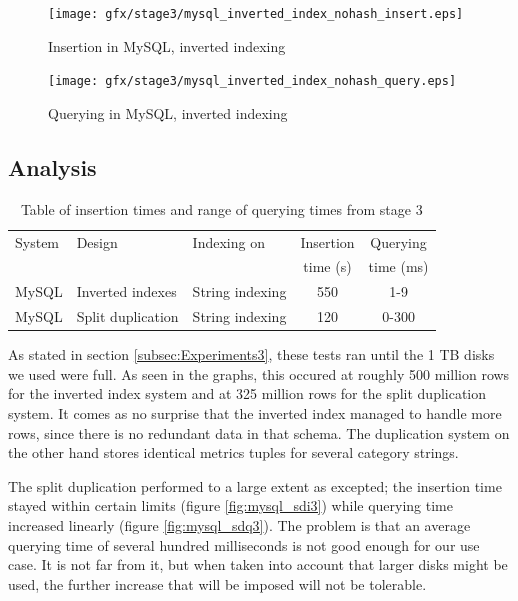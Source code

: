 \begin{figure} 
    \centering
    \texttt{[image: gfx/stage3/mysql\_inverted\_index\_nohash\_insert.eps]}
    \caption{Insertion in MySQL, inverted indexing}
    \label{fig:mysql_iini3}
\end{figure}
\begin{figure} 
    \centering
    \texttt{[image: gfx/stage3/mysql\_inverted\_index\_nohash\_query.eps]}
    \caption{Querying in MySQL, inverted indexing}
    \label{fig:mysql_iinq3}
\end{figure}
\clearpage
\subsection{Analysis}

\begin{table}
\caption{Table of insertion times and range of querying times from stage 3}
\centering
\begin{tabular}{l|l|l|c|c}
\hline\hline
System       & Design            & Indexing on     & Insertion & Querying    \\
             &                   &                 & time (s)  & time (ms)   \\
\hline
MySQL        & Inverted indexes  & String indexing & 550       & 1-9         \\
MySQL        & Split duplication & String indexing & 120       & 0-300       \\
\hline
\end{tabular}
\end{table}

As stated in section \ref{subsec:Experiments3}, these tests ran until the 1 TB disks we used were full. As seen in the graphs, this occured at roughly 500 million rows for the inverted index system and at 325 million rows for the split duplication system. It comes as no surprise that the inverted index managed to handle more rows, since there is no redundant data in that schema. The duplication system on the other hand stores identical metrics tuples for several category strings.

The split duplication performed to a large extent as excepted; the insertion time stayed within certain limits (figure \ref{fig:mysql_sdi3}) while querying time increased linearly (figure \ref{fig:mysql_sdq3}). The problem is that an average querying time of several hundred milliseconds is not good enough for our use case. It is not far from it, but when taken into account that larger disks might be used, the further increase that will be imposed will not be tolerable.

